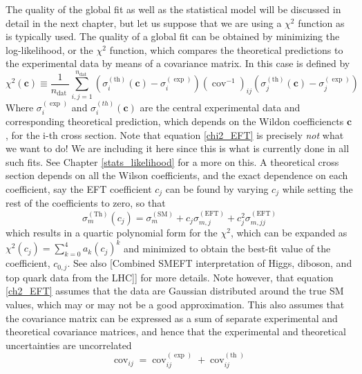The quality of the global fit as well as the statistical model will be discussed in detail in the next chapter, but let us suppose that we are using a $\chi^2$ function as is typically used.
The quality of a global fit can be obtained by minimizing the log-likelihood, or the $\chi^2$ function, which compares the theoretical predictions to the experimental data by means of a covariance matrix. In this case is defined by 
\begin{equation}
    \chi^{2}(\boldsymbol{c}) \equiv \frac{1}{n_{\text {dat }}} \sum_{i, j=1}^{n_{\text {dat }}}\left(\sigma_{i}^{(\mathrm{th})}(\boldsymbol{c})-\sigma_{i}^{(\exp )}\right)\left(\operatorname{cov}^{-1}\right)_{i j}\left(\sigma_{j}^{(\mathrm{th})}(\boldsymbol{c})-\sigma_{j}^{(\exp )}\right)
    \label{chi2_EFT}
\end{equation}
Where $\sigma_{i}^{(\exp )}$ and $\sigma_{i}^{(t h)}(\boldsymbol{c})$ are the central experimental data and corresponding theoretical prediction, which depends on the Wildon coefficiencts $\boldsymbol{c}$, for the i-th cross section. Note that equation \ref{chi2_EFT} is precisely \emph{not} what we want to do! We are including it here since this is what is currently done in all such fits. See Chapter \ref{stats_likelihood} for a more on this.
A theoretical cross section depends on all the Wilson coefficients, and the exact dependence on each coefficient, say the EFT coefficient $c_j$ can be found by varying $c_j$ while setting the rest of the coefficients to zero, so that 
\begin{equation}
    \sigma_{m}^{(\mathrm{Th})}\left(c_{j}\right)=\sigma_{m}^{(\mathrm{SM})}+c_{j} \sigma_{m, j}^{(\mathrm{EFT})}+c_{j}^{2} \sigma_{m, j j}^{(\mathrm{EFT})}
\end{equation}
which results in a quartic polynomial form for the $\chi^2$, which can be expanded as $\chi^{2}\left(c_{j}\right)=\sum_{k=0}^{4} a_{k}\left(c_{j}\right)^{k}$ and minimized to obtain the best-fit value of the coefficient, $c_{0,j}$. See also [Combined SMEFT interpretation of Higgs, diboson,
and top quark data from the LHC]] for more details.
Note however, that equation \ref{ch2_EFT} assumes that the data are Gaussian distributed around the true SM values, which may or may not be a good approximation. This also assumes that the covariance matrix can be expressed as a sum of separate experimental and theoretical covariance matrices, and hence that the experimental and theoretical uncertainties are uncorrelated
\begin{equation}
    \operatorname{cov}_{i j}=\operatorname{cov}_{i j}^{(\exp )}+\operatorname{cov}_{i j}^{(\text {th })}
\end{equation}


